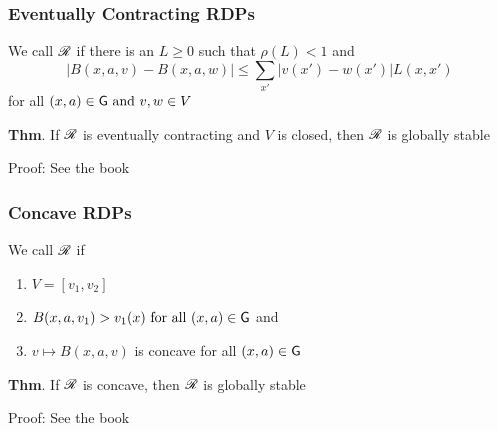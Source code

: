 \documentclass[dvipsnames]{beamer}
\begin{document}
\begin{frame}
    \frametitle{Eventually Contracting RDPs}
    

        \vspace{0.5em}
    We call $\mathscr R$  if 
    there is an $L \geq 0$ such that $\rho(L) < 1$ and 
    \begin{equation*}
        |B(x, a, v)-B(x, a, w)|
        \leq \sum_{x'} |v(x') - w(x')| L(x, x')
    \end{equation*}
   for all $(x, a) \in \mathsf G \text{ and } v, w \in V$


        \vspace{0.5em}
        \vspace{0.5em}
        \vspace{0.5em}
   {\bf Thm}. If $\mathscr R$ is eventually contracting and $V$ is closed, then $\mathscr R$
   is globally stable


        \vspace{0.5em}
   Proof: See the book

\end{frame}



\begin{frame}
    \frametitle{Concave RDPs}
    
    We call $\mathscr R$  if
    \begin{enumerate}
        \item  $V = [v_1, v_2]$ 
        \vspace{0.5em}
        \item $B(x, a, v_1) >  v_1(x) \text{ for all } (x, a) \in \mathsf G$ and
        \vspace{0.5em}
        \item $v \mapsto B(x,a,v)$ is concave  for all $(x, a) \in \mathsf G$
    \end{enumerate}


        \vspace{0.5em}
        \vspace{0.5em}
        \vspace{0.5em}
        \vspace{0.5em}
   {\bf Thm}. If $\mathscr R$ is concave, then $\mathscr R$
   is globally stable


        \vspace{0.5em}
   Proof: See the book

\end{frame}
\end{document}
